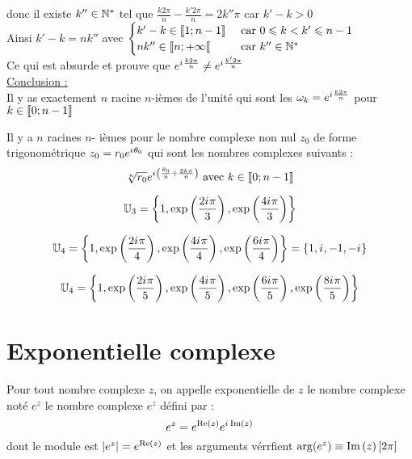 \begin{dem}
    donc il existe \(k'' \in \mathbb{N}^*\) tel que \(\frac{k2\pi}{n} -\frac{k'2\pi}{n} = 2 k'' \pi\) car \(k'-k >0\)\\
    Ainsi \(k'-k = nk''\) avec \(\begin{cases}
        k'-k \in \left\llbracket1;n-1\right\rrbracket &\text{ car } 0\leqslant k<k'\leqslant n-1 \\
        nk'' \in \left\llbracket n;+\infty\right\llbracket & \text{ car } k''\in \mathbb{N}^*
    \end{cases}\) \\
    Ce qui est absurde et prouve que \(e^{i\mkern1mu \frac{k2\pi}{n}} \neq e^{i\mkern1mu \frac{k'2\pi}{n}}\)\\
    \underline{Conclusion :} \\
    Il y as exactement \(n\) racine \(n\)-ièmes de l'unité qui sont les \( \omega_k = e^{i\mkern1mu \frac{k2\pi}{n}}\) pour \(k\in \left\llbracket0;n-1\right\rrbracket\)
\end{dem}


\begin{defprop}
    Il y a \(n\) racines \(n\)- ièmes pour le nombre complexe non nul \(z_0\) de forme trigonométrique \(z_0 = r_0e^{i\mkern1mu\theta_0}\) qui sont les nombres complexes suivants :
    \[\sqrt[n]{r_0}e^{i\mkern1mu \left(\frac{\theta_0}{n}+\frac{2k\pi}{n}\right)} \text{ avec }k \in \left\llbracket0;n-1\right\rrbracket\]
\end{defprop}

\begin{ex}
\[\mathbb{U}_3 = \left\lbrace1,\exp\left(\frac{2i\mkern1mu \pi}{3}\right),\exp \left(\frac{4 i\mkern1mu \pi}{3}\right)\right\rbrace\]

\[\mathbb{U}_4 = \left\lbrace1,\exp\left(\frac{2i\mkern1mu \pi}{4}\right),\exp \left(\frac{4 i\mkern1mu \pi}{4}\right),\exp \left(\frac{6 i\mkern1mu \pi}{4}\right)\right\rbrace = \left\lbrace1,i\mkern1mu,-1,-i\mkern1mu\right\rbrace\]

\[\mathbb{U}_4 = \left\lbrace1,\exp\left(\frac{2i\mkern1mu \pi}{5}\right),\exp \left(\frac{4 i\mkern1mu \pi}{5}\right),\exp \left(\frac{6 i\mkern1mu \pi}{5}\right),\exp \left(\frac{8i\mkern1mu \pi}{5}\right)\right\rbrace \]

\end{ex}

\section{Exponentielle complexe}
\begin{defi}
Pour tout nombre complexe \(z\), on appelle exponentielle de \(z\) le nombre complexe noté \(e^z\) le nombre complexe \(e^z\) défini par : 
\[e^z = e^{\operatorname{Re}\left(z\right)}e^{i\mkern1mu \operatorname{Im}\left(z\right)}\]
dont le module est \(\left\lvert e^z\right\rvert = e^{\operatorname{Re}\left(z\right)}\) et les arguments vérrfient \(\arg(e^z)\equiv \operatorname{Im}\left(z\right) [2\pi]\)
\end{defi}

